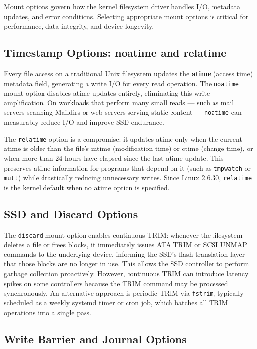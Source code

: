 Mount options govern how the kernel filesystem driver handles I/O, metadata updates, and error conditions. Selecting appropriate mount options is critical for performance, data integrity, and device longevity.

\subsection{Timestamp Options: noatime and relatime}

Every file access on a traditional Unix filesystem updates the \textbf{atime} (access time) metadata field, generating a write I/O for every read operation. The \texttt{noatime} mount option disables atime updates entirely, eliminating this write amplification. On workloads that perform many small reads --- such as mail servers scanning Maildirs or web servers serving static content --- \texttt{noatime} can measurably reduce I/O and improve SSD endurance.

The \texttt{relatime} option is a compromise: it updates atime only when the current atime is older than the file's mtime (modification time) or ctime (change time), or when more than 24 hours have elapsed since the last atime update. This preserves atime information for programs that depend on it (such as \texttt{tmpwatch} or \texttt{mutt}) while drastically reducing unnecessary writes. Since Linux 2.6.30, \texttt{relatime} is the kernel default when no atime option is specified.

\subsection{SSD and Discard Options}

The \texttt{discard} mount option enables continuous TRIM: whenever the filesystem deletes a file or frees blocks, it immediately issues ATA TRIM or SCSI UNMAP commands to the underlying device, informing the SSD's flash translation layer that those blocks are no longer in use. This allows the SSD controller to perform garbage collection proactively. However, continuous TRIM can introduce latency spikes on some controllers because the TRIM command may be processed synchronously. An alternative approach is periodic TRIM via \texttt{fstrim}, typically scheduled as a weekly systemd timer or cron job, which batches all TRIM operations into a single pass.

\subsection{Write Barrier and Journal Options}


